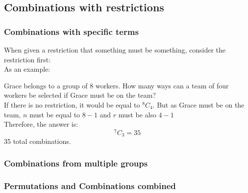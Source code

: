 \documentclass[a4paper,10pt]{report}
\newcommand{\Comb}[2]{{}^{#1}C_{#2}}
\begin{document}
\subsection{Combinations with restrictions}
\subsubsection{Combinations with specific terms}
When given a restriction that something must be something, consider the restriction first:\\
As an example:
\begin{center}
	Grace belongs to a group of 8 workers.  How many ways can a team of four workers be selected if Grace must be on the team?\\
	If there is no restriction, it would be equal to $\Comb{8}{4}$.  But as Grace must be on the team, $n$ must be equal to $8 - 1$ and $r$ must be also $4 - 1$\\
	Therefore, the answer is:
	$$
		\Comb{7}{3} = 35
	$$
	35 total combinations.
\end{center}

\subsubsection{Combinations from multiple groups}

\subsubsection{Permutations and Combinations combined}
\end{document}
